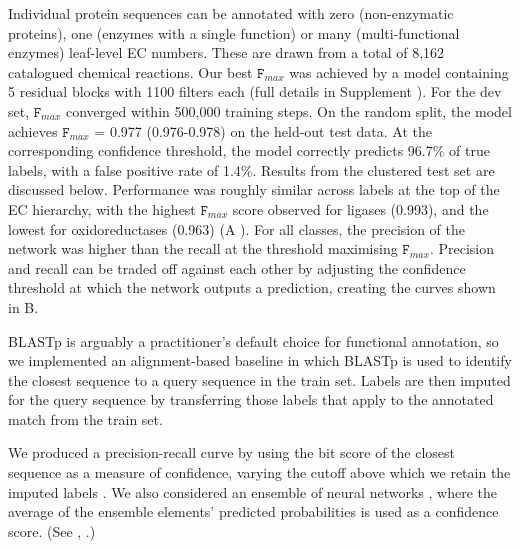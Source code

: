 Individual protein sequences can be annotated with zero (non-enzymatic proteins), one (enzymes with a single function) or many (multi-functional enzymes) leaf-level EC numbers. These are drawn from a total of 8,162 catalogued chemical reactions.
Our best $\texttt{F}_{max}$ was achieved by a model containing 5 residual blocks with 1100 filters each (full details in \textnormal{ Supplement}%
). For the dev set, $\texttt{F}_{max}$ converged within 500,000 training steps. On the random split, the model achieves $\texttt{F}_{max}$ = 0.977 (0.976-0.978) on the held-out test data. At the corresponding confidence threshold, the model correctly predicts 96.7\% of true labels, with a false positive rate of 1.4\%. Results from the clustered test set are discussed below.
Performance was roughly similar across labels at the top of the EC hierarchy, with the highest $\texttt{F}_{max}$ score observed for ligases (0.993), and the lowest for oxidoreductases (0.963) (A%
). For all classes, the precision of the network was higher than the recall at the threshold maximising $\texttt{F}_{max}$. Precision and recall can be traded off against each other by adjusting the confidence threshold at which the network outputs a prediction, creating the curves shown in B.%

BLASTp is arguably a practitioner's default choice for functional annotation, so we implemented an alignment-based baseline in which BLASTp is used to identify the closest sequence to a query sequence in the train set. Labels are then imputed for the query sequence by transferring those labels that apply to the annotated match from the train set.



We produced a precision-recall curve by using the bit score of the closest sequence as a measure of confidence, varying the cutoff above which we retain the imputed labels \cite{zhou2019cafa, eddy2011accelerated}. We also considered an ensemble of neural networks \cite{bileschi}, where the average of the ensemble elements' predicted probabilities is used as a confidence score. %
(See , .)


